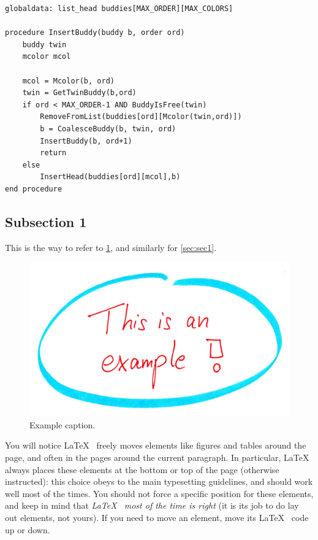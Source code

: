 \documentclass[12pt,oneside,a4paper]{article}
\begin{document}
\begin{lstlisting}[label={list:exlistings},caption={Example of code snippet}]
globaldata: list_head buddies[MAX_ORDER][MAX_COLORS]

procedure InsertBuddy(buddy b, order ord)
	buddy twin
	mcolor mcol
	
	mcol = Mcolor(b, ord)
	twin = GetTwinBuddy(b,ord)	
	if ord < MAX_ORDER-1 AND BuddyIsFree(twin)
		RemoveFromList(buddies[ord][Mcolor(twin,ord)])
		b = CoalesceBuddy(b, twin, ord)
		InsertBuddy(b, ord+1)
		return
	else
		InsertHead(buddies[ord][mcol],b)
end procedure
\end{lstlisting}

\subsection{Subsection 1} \label{sec:sub1}
This is the way to refer to \cref{fig:example}, and similarly for \cref{sec:sec1}.
\begin{figure}
	\centering
	\includegraphics[width=.7\textwidth]{example.jpg}
	\caption{Example caption.}
	\label{fig:example}
\end{figure}
You will notice \LaTeX~ freely moves elements like figures and tables around the page, and often in the pages around the current paragraph. In particular, \LaTeX~ always places these elements at the bottom or top of the page (otherwise instructed): this choice obeys to the main typesetting guidelines, and should work well most of the times. You should not force a specific position for these elements, and keep in mind that \textit{\LaTeX~ most of the time is right} (it is its job to do lay out elements, not yours). If you need to move an element, move its \LaTeX~ code up or down.
\end{document}
